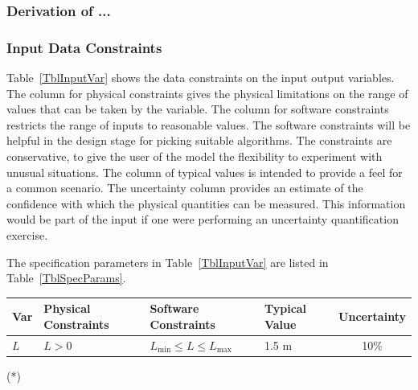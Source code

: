 \documentclass[12pt]{article}
\begin{document}

\subsubsection*{Derivation of ...}


\subsubsection{Input Data Constraints} \label{sec_DataConstraints}    

Table~\ref{TblInputVar} shows the data constraints on the input output
variables.  The column for physical constraints gives the physical limitations
on the range of values that can be taken by the variable.  The column for
software constraints restricts the range of inputs to reasonable values.  The
software constraints will be helpful in the design stage for picking suitable
algorithms.  The constraints are conservative, to give the user of the model the
flexibility to experiment with unusual situations.  The column of typical values
is intended to provide a feel for a common scenario.  The uncertainty column
provides an estimate of the confidence with which the physical quantities can be
measured.  This information would be part of the input if one were performing an
uncertainty quantification exercise.

The specification parameters in Table~\ref{TblInputVar} are listed in
Table~\ref{TblSpecParams}.

\begin{table}[!h]
  \caption{Input Variables} \label{TblInputVar}
  \renewcommand{\arraystretch}{1.2}
\noindent \begin{longtable*}{l l l l c} 
  \toprule
  \textbf{Var} & \textbf{Physical Constraints} & \textbf{Software Constraints} &
                             \textbf{Typical Value} & \textbf{Uncertainty}\\
  \midrule 
  $L$ & $L > 0$ & $L_{\text{min}} \leq L \leq L_{\text{max}}$ & 1.5 \si[per-mode=symbol] {\metre} & 10\%
  \\
  \bottomrule
\end{longtable*}
\end{table}

\noindent 
\begin{description}
\item[(*)] 
\end{description}
\end{document}
